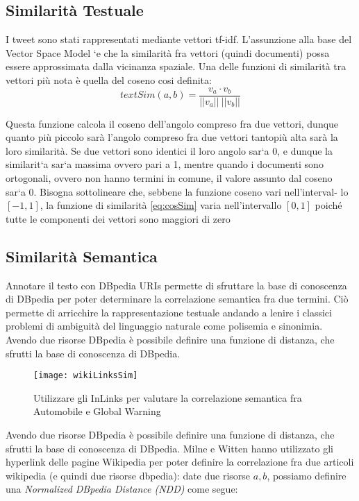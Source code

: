 \subsection{Similarità Testuale}
\label{sec:simtext}
I tweet sono stati rappresentati mediante vettori tf-idf. L'assunzione alla base
del Vector Space Model `e che la similarità fra vettori (quindi documenti) possa essere approssimata dalla vicinanza spaziale. Una delle funzioni di similarità tra vettori più nota è quella del coseno cosi definita:
\begin{equation}
\label{eq:cosSim}
textSim(a,b)=\frac{v_a \cdot  v_b}{||v_a||\:||v_b||}
\end{equation}

Questa funzione calcola il coseno dell'angolo compreso fra due vettori, dunque
quanto più piccolo sarà l'angolo compreso fra due vettori tantopiù alta sarà
la loro similarità. Se due vettori sono identici il loro angolo sar`a 0, e dunque
la similarit`a sar`a massima ovvero pari a 1, mentre quando i documenti sono
ortogonali, ovvero non hanno termini in comune, il valore assunto dal coseno
sar`a 0. Bisogna sottolineare che, sebbene la funzione coseno vari nell’interval-
lo $[−1, 1]$, la funzione di similarità \ref{eq:cosSim}  varia nell'intervallo $[0, 1]$ poiché tutte
le componenti dei vettori sono maggiori di zero

\subsection{Similarità Semantica}
\label{sec:simSem}

Annotare il testo con DBpedia URIs permette di sfruttare la base di conoscenza di DBpedia per poter determinare la correlazione semantica fra due termini. Ciò permette di arricchire la rappresentazione testuale andando a lenire
i classici problemi di ambiguità del linguaggio naturale come polisemia e
sinonimia. Avendo due risorse DBpedia è possibile definire una funzione di
distanza, che sfrutti la base di conoscenza di DBpedia.

 

 \begin{figure}[h]
    \centering
    \texttt{[image: wikiLinksSim]}
    \caption{Utilizzare gli InLinks per valutare la correlazione semantica fra Automobile e Global Warning}
  \label{fig:wikiLinkSim}
  \end{figure}  

Avendo due risorse DBpedia è possibile definire una funzione di
distanza, che sfrutti la base di conoscenza di DBpedia. 
Milne e Witten \cite{Milne08aneffective} hanno utilizzato gli hyperlink delle pagine Wikipedia per poter definire la correlazione fra due articoli wikipedia (e quindi due risorse dbpedia): date due risorse $a,b$, possiamo definire una \emph{Normalized DBpedia Distance (NDD)} come segue:


